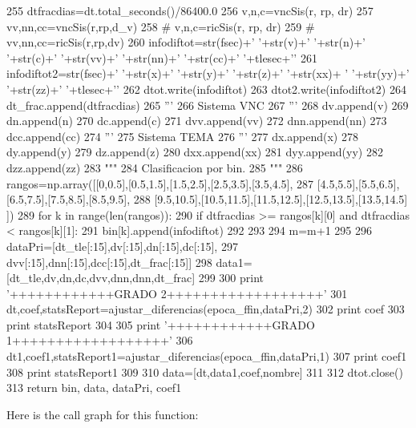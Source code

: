 \begin{DoxyCode}
255             dtfracdias=dt.total_seconds()/86400.0
256             v,n,c=vncSis(r, rp, dr)
257             vv,nn,cc=vncSis(r,rp,d_v)
258 #             v,n,c=ricSis(r, rp, dr)
259 #             vv,nn,cc=ricSis(r,rp,dv)
260             infodiftot=str(fsec)+' '+str(v)+' '+str(n)+' '+str(c)+' '+str(vv)+'
       '+str(nn)+' '+str(cc)+' '+tlesec+'\n'
261             infodiftot2=str(fsec)+' '+str(x)+' '+str(y)+' '+str(z)+' '+str(xx)+
      ' '+str(yy)+' '+str(zz)+' '+tlesec+'\n'
262             dtot.write(infodiftot)
263             dtot2.write(infodiftot2)
264             dt_frac.append(dtfracdias)
265             '''
266             Sistema VNC
267             '''
268             dv.append(v)
269             dn.append(n)
270             dc.append(c)
271             dvv.append(vv)
272             dnn.append(nn)
273             dcc.append(cc)
274             '''
275             Sistema TEMA
276             '''
277             dx.append(x)
278             dy.append(y)
279             dz.append(z)
280             dxx.append(xx)
281             dyy.append(yy)
282             dzz.append(zz)           
283             """
284             Clasificacion por bin.
285             """
286             rangos=np.array([[0,0.5],[0.5,1.5],[1.5,2.5],[2.5,3.5],[3.5,4.5],
287                      [4.5,5.5],[5.5,6.5],[6.5,7.5],[7.5,8.5],[8.5,9.5],
288                      [9.5,10.5],[10.5,11.5],[11.5,12.5],[12.5,13.5],[13.5,14.5]
      ])
289             for k in range(len(rangos)):
290                 if dtfracdias >= rangos[k][0] and dtfracdias < rangos[k][1]:
291                     bin[k].append(infodiftot)
292                     
293             
294         m=m+1 
295             
296     dataPri=[dt_tle[:15],dv[:15],dn[:15],dc[:15],
297              dvv[:15],dnn[:15],dcc[:15],dt_frac[:15]]    
298     data1=[dt_tle,dv,dn,dc,dvv,dnn,dnn,dt_frac]
299     
300     print '++++++++++++GRADO 2++++++++++++++++++'
301     dt,coef,statsReport=ajustar_diferencias(epoca_ffin,dataPri,2)
302     print coef
303     print statsReport
304     
305     print '++++++++++++GRADO 1++++++++++++++++++'
306     dt1,coef1,statsReport1=ajustar_diferencias(epoca_ffin,dataPri,1)
307     print coef1
308     print statsReport1
309     
310     data=[dt,data1,coef,nombre]
311         
312     dtot.close()
313     return bin, data, dataPri, coef1

\end{DoxyCode}


\-Here is the call graph for this function\-:


